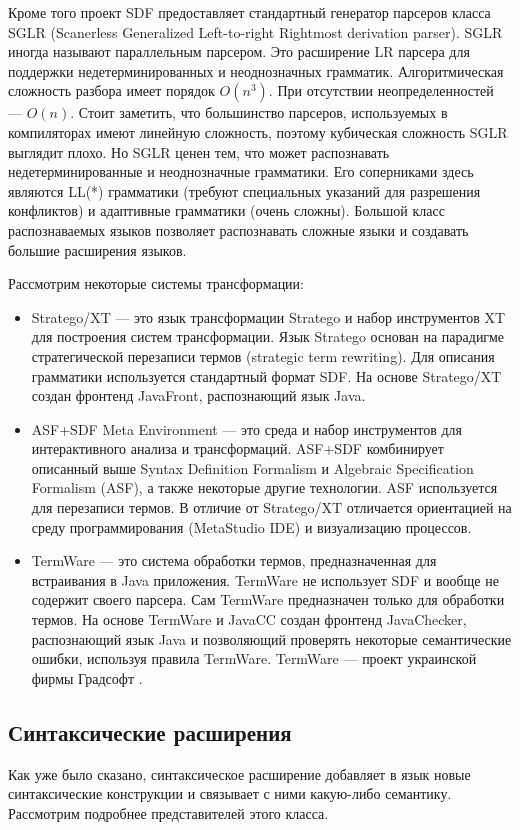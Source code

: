 \documentclass[a4paper,12pt,titlepage]{extarticle}
\begin{document}
Кроме того проект SDF предоставляет стандартный генератор парсеров класса SGLR
(Scanerless Generalized Left-to-right Rightmost derivation parser). SGLR иногда
называют параллельным парсером. Это расширение LR парсера для поддержки
недетерминированных и неоднозначных грамматик. Алгоритмическая сложность разбора
имеет порядок $O(n^3)$. При отсутствии неопределенностей --- $O(n)$. Стоит
заметить, что большинство парсеров, используемых в компиляторах имеют линейную
сложность, поэтому кубическая сложность SGLR выглядит плохо. Но SGLR ценен тем,
что может распознавать недетерминированные и неоднозначные грамматики. Его
соперниками здесь являются LL(*) грамматики (требуют специальных указаний для
разрешения конфликтов) и адаптивные грамматики (очень сложны). Большой класс
распознаваемых языков позволяет распознавать сложные языки и создавать
большие расширения языков.

Рассмотрим некоторые системы трансформации:
\begin{itemize}
  \item Stratego/XT --- это язык трансформации Stratego и набор инструментов 
  XT для построения систем трансформации. Язык Stratego основан на парадигме
  стратегической перезаписи термов (strategic term rewriting). Для описания
  грамматики используется стандартный формат SDF. На основе Stratego/XT создан
  фронтенд JavaFront, распознающий язык Java.
  \item ASF+SDF Meta Environment --- это среда и набор инструментов для
  интерактивного анализа и трансформаций. ASF+SDF комбинирует описанный
  выше Syntax Definition Formalism и Algebraic Specification Formalism (ASF), а
  также некоторые другие технологии. ASF используется для перезаписи термов.
  В отличие от Stratego/XT отличается ориентацией на среду программирования
  (MetaStudio IDE) и визуализацию процессов.
  \item TermWare --- это система обработки термов, предназначенная для
  встраивания в Java приложения. TermWare не использует SDF и вообще не
  содержит своего парсера. Сам TermWare предназначен только для обработки
  термов. На основе TermWare и JavaCC создан фронтенд JavaChecker, распознающий
  язык Java и позволяющий проверять некоторые семантические ошибки, используя
  правила TermWare. TermWare --- проект украинской фирмы Градсофт
  \cite{termware}.
\end{itemize}

\subsection{Синтаксические расширения}
Как уже было сказано, синтаксическое расширение добавляет в язык новые
синтаксические конструкции и связывает с ними какую-либо семантику.
Рассмотрим подробнее представителей этого класса.
\end{document}
